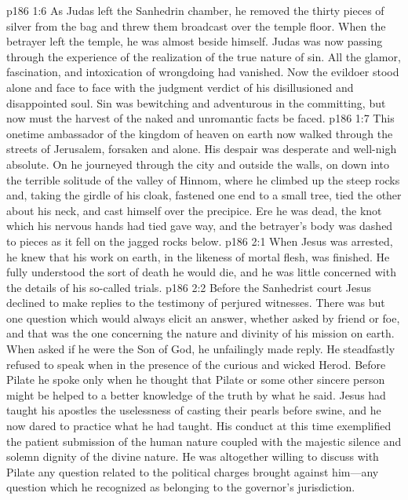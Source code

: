 \vs p186 1:6 As Judas left the Sanhedrin chamber, he removed the thirty pieces of silver from the bag and threw them broadcast over the temple floor. When the betrayer left the temple, he was almost beside himself. Judas was now passing through the experience of the realization of the true nature of sin. All the glamor, fascination, and intoxication of wrongdoing had vanished. Now the evildoer stood alone and face to face with the judgment verdict of his disillusioned and disappointed soul. Sin was bewitching and adventurous in the committing, but now must the harvest of the naked and unromantic facts be faced.
\vs p186 1:7 This onetime ambassador of the kingdom of heaven on earth now walked through the streets of Jerusalem, forsaken and alone. His despair was desperate and well\hyp{}nigh absolute. On he journeyed through the city and outside the walls, on down into the terrible solitude of the valley of Hinnom, where he climbed up the steep rocks and, taking the girdle of his cloak, fastened one end to a small tree, tied the other about his neck, and cast himself over the precipice. Ere he was dead, the knot which his nervous hands had tied gave way, and the betrayer’s body was dashed to pieces as it fell on the jagged rocks below.
%
\vs p186 2:1 When Jesus was arrested, he knew that his work on earth, in the likeness of mortal flesh, was finished. He fully understood the sort of death he would die, and he was little concerned with the details of his so\hyp{}called trials.
\vs p186 2:2 Before the Sanhedrist court Jesus declined to make replies to the testimony of perjured witnesses. There was but one question which would always elicit an answer, whether asked by friend or foe, and that was the one concerning the nature and divinity of his mission on earth. When asked if he were the Son of God, he unfailingly made reply. He steadfastly refused to speak when in the presence of the curious and wicked Herod. Before Pilate he spoke only when he thought that Pilate or some other sincere person might be helped to a better knowledge of the truth by what he said. Jesus had taught his apostles the uselessness of casting their pearls before swine, and he now dared to practice what he had taught. His conduct at this time exemplified the patient submission of the human nature coupled with the majestic silence and solemn dignity of the divine nature. He was altogether willing to discuss with Pilate any question related to the political charges brought against him---any question which he recognized as belonging to the governor’s jurisdiction.
